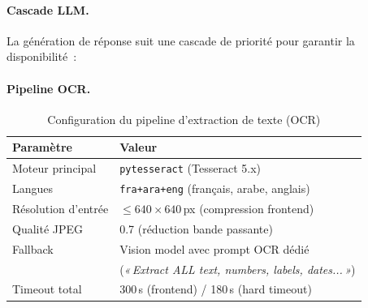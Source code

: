 \paragraph{Cascade LLM.}
La génération de réponse suit une cascade de priorité pour garantir la disponibilité~:

\begin{table}[H]
\centering
\caption{Cascade LLM --- Génération de réponses en Darija (texte et vision)}
\label{tab:cascade_llm}
\end{table}

\paragraph{Pipeline OCR.}

\begin{table}[H]
\centering
\caption{Configuration du pipeline d'extraction de texte (OCR)}
\label{tab:ocr_pipeline}
\begin{tabular}{ll}
\toprule
\textbf{Paramètre} & \textbf{Valeur} \\
\midrule
Moteur principal      & \texttt{pytesseract} (Tesseract 5.x) \\
Langues               & \texttt{fra+ara+eng} (français, arabe, anglais) \\
Résolution d'entrée   & $\leq 640 \times 640$\,px (compression frontend) \\
Qualité JPEG          & 0.7 (réduction bande passante) \\
Fallback              & Vision model avec prompt OCR dédié \\
                      & (\textit{«\,Extract ALL text, numbers, labels, dates...\,»}) \\
Timeout total         & 300\,s (frontend) / 180\,s (hard timeout) \\
\bottomrule
\end{tabular}
\end{table}

